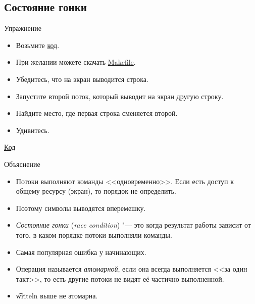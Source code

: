 \subsection{Состояние гонки}

\begin{frame}
\end{frame}

\begin{frame}{Упражнение}
	\begin{itemize}
		\item Возьмите \href{https://github.com/yeputons/fall-2017-paradigms/raw/master/171023/sources/03-writeln-single.cpp}{код}.
		\item При желании можете скачать \href{https://github.com/yeputons/fall-2017-paradigms/raw/master/171023/sources/Makefile}{Makefile}.
		\item Убедитесь, что на экран выводится строка.
		\item Запустите второй поток, который выводит на экран другую строку.
		\item Найдите место, где первая строка сменяется второй.
		\item Удивитесь.
	\end{itemize}
	\href{https://github.com/yeputons/fall-2017-paradigms/raw/master/171023/sources/04-writeln-race.cpp}{Код}
\end{frame}

\begin{frame}{Объяснение}
	\begin{itemize}
		\item
			Потоки выполняют команды <<одновременно>>.
			Если есть доступ к общему ресурсу (экран), то порядок не определить.
		\item
			Поэтому символы выводятся вперемешку.
		\item
			\textit{Состояние гонки} (\textit{race condition}) "--- это когда результат работы зависит от того, в каком порядке потоки выполняли команды.
		\item
			Самая популярная ошибка у начинающих.
		\item
			Операция называется \textit{атомарной}, если она всегда выполняется <<за один такт>>,
			то есть другие потоки не видят её частично выполненной.
		\item
			\t{writeln} выше не атомарна.
	\end{itemize}
\end{frame}

